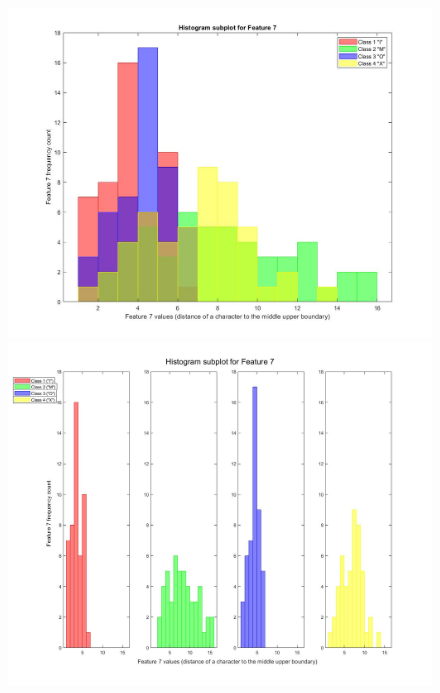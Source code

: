 \documentclass[a4paper,12pt]{article}
\begin{document}
\begin{figure}[H]
\centering
\includegraphics[scale=0.3]{q1pc_7.jpg}
\includegraphics[scale=0.3]{q1pcs_7.jpg}
\end{figure}
\pagebreak
\end{document}
